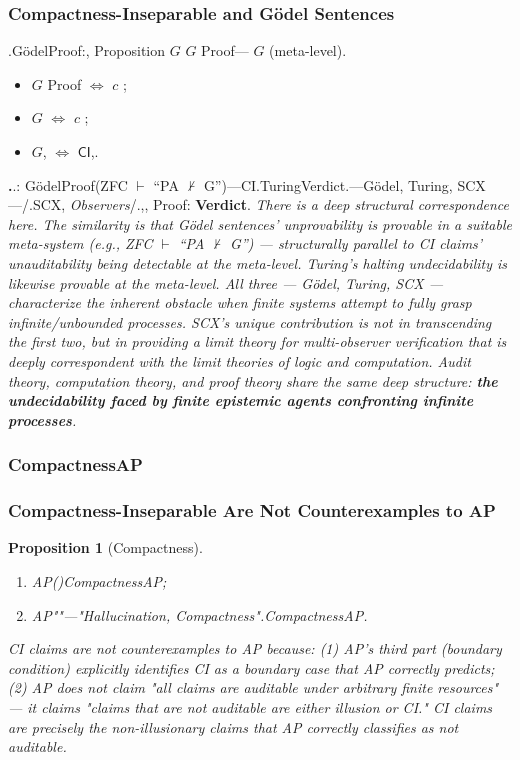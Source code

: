 \documentclass[12pt,a4paper]{article}
\theoremstyle{plain}
\newtheorem{proposition}[theorem]{Proposition}
\theoremstyle{definition}
\theoremstyle{remark}
\begin{document}
\subsubsection{Compactness-Inseparable and G\"odel Sentences}
.G\"odelProof:, Proposition $G$ $G$ Proof--- $G$ (meta-level).
\begin{itemize}
 \item $G$ Proof $\iff$ $c$ ; 
 \item $G$ $\iff$ $c$ ; 
 \item $G$, $\iff$ $\mathsf{CI}$,.
\end{itemize}
\textbf{.}.: G\"odelProof(ZFC $\vdash$ ``PA $\nvdash$ G'')---CI\emph{}.TuringVerdict.---G\"odel, Turing, SCX---/.SCX\emph{}, \emph{Observers}/.,, Proof: \textbf{Verdict}.
\vspace{4pt}
\noindent
\textit{There is a deep structural correspondence here. The similarity is that G\"odel sentences' unprovability is provable in a suitable meta-system (e.g., ZFC $\vdash$ ``PA $\nvdash$ G'') --- structurally parallel to CI claims' unauditability being detectable at the meta-level. Turing's halting undecidability is likewise provable at the meta-level. All three --- G\"odel, Turing, SCX --- characterize the inherent obstacle when finite systems attempt to fully grasp infinite/unbounded processes. SCX's unique contribution is not in \emph{transcending} the first two, but in providing a limit theory for \emph{multi-observer verification} that is deeply correspondent with the limit theories of logic and computation. Audit theory, computation theory, and proof theory share the same deep structure: \textbf{the undecidability faced by finite epistemic agents confronting infinite processes}.}
\subsubsection{CompactnessAP}
\subsubsection{Compactness-Inseparable Are Not Counterexamples to AP}
\begin{proposition}[Compactness]\label{prop:ci_not_counter}
\begin{enumerate}[label=(\arabic*)]
 \item AP()CompactnessAP; 
 \item AP""---"Hallucination, Compactness".CompactnessAP.
\end{enumerate}
\end{proposition}
\vspace{4pt}
\noindent
\textit{CI claims are not counterexamples to AP because: (1) AP's third part (boundary condition) explicitly identifies CI as a boundary case that AP correctly predicts; (2) AP does not claim "all claims are auditable under arbitrary finite resources" --- it claims "claims that are not auditable are either illusion or CI." CI claims are precisely the non-illusionary claims that AP correctly classifies as not auditable.}
\newpage
\end{document}
